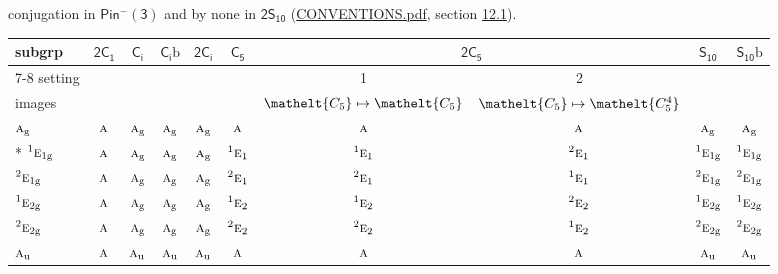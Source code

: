 \documentclass[10pt,a4paper]{article}
\numberwithin{equation}{section}
\newcommand{\eltfont}[1]{{\let\sigma\eltsigma\mathelt{#1}}}
\newcommand{\grp}[1]{\mathsf{#1}}
\newcommand{\irr}[1]{\text{\normalfont\scshape #1}}
\newcommand{\conjpair}[1]{{}^{#1}}
\newcommand{\cls}[1]{\eltfont{#1}}
\newcommand{\ptag}[1]{\mathrm{#1}}
\newcommand{\secondclass}{\mathrm{b}}
\begin{document}
conjugation in \href{Pinminus3.pdf}{$\grp{Pin^{-}(3)}$} and by none in $\grp{2S_{10}}$ (\href{../../CONVENTIONS.pdf}{CONVENTIONS.pdf}, section \href{../../../rotation/CONVENTIONS.pdf\#conv.12.1}{12.1}).
{\small\begin{longtable}{@{}lccccccccc@{}}\toprule
subgrp & \href{2C1.pdf}{$\grp{2C_{1}}$} & \href{S2.pdf}{$\grp{C_{i}}$} & \href{S2b.pdf}{$\grp{C_{i}}\secondclass$} & \href{2S2.pdf}{$\grp{2C_{i}}$} & \href{C5.pdf}{$\grp{C_{5}}$} & \multicolumn{2}{c}{\href{2C5.pdf}{$\grp{2C_{5}}$}} & \href{S10.pdf}{$\grp{S_{10}}$} & \href{S10b.pdf}{$\grp{S_{10}}\secondclass$}\\\cmidrule(lr){7-8}
setting &  &  &  &  &  & 1 & 2 &  & \\
images &  &  &  &  &  & {\scriptsize $\cls{C_{5}} \mapsto \cls{C_{5}}$} & {\scriptsize $\cls{C_{5}} \mapsto \cls{C_{5}^{4}}$} &  & \\\midrule\endhead
\bottomrule\endfoot\endlastfoot
$\irr{a}_{\ptag{g}}$ & $\irr{a}$ & $\irr{a}_{\ptag{g}}$ & $\irr{a}_{\ptag{g}}$ & $\irr{a}_{\ptag{g}}$ & $\irr{a}$ & $\irr{a}$ & $\irr{a}$ & $\irr{a}_{\ptag{g}}$ & $\irr{a}_{\ptag{g}}$\\*
$\conjpair{1}\irr{e}_{1\ptag{g}}$ & $\irr{a}$ & $\irr{a}_{\ptag{g}}$ & $\irr{a}_{\ptag{g}}$ & $\irr{a}_{\ptag{g}}$ & $\conjpair{1}\irr{e}_{1}$ & $\conjpair{1}\irr{e}_{1}$ & $\conjpair{2}\irr{e}_{1}$ & $\conjpair{1}\irr{e}_{1\ptag{g}}$ & $\conjpair{1}\irr{e}_{1\ptag{g}}$\\
$\conjpair{2}\irr{e}_{1\ptag{g}}$ & $\irr{a}$ & $\irr{a}_{\ptag{g}}$ & $\irr{a}_{\ptag{g}}$ & $\irr{a}_{\ptag{g}}$ & $\conjpair{2}\irr{e}_{1}$ & $\conjpair{2}\irr{e}_{1}$ & $\conjpair{1}\irr{e}_{1}$ & $\conjpair{2}\irr{e}_{1\ptag{g}}$ & $\conjpair{2}\irr{e}_{1\ptag{g}}$\\
$\conjpair{1}\irr{e}_{2\ptag{g}}$ & $\irr{a}$ & $\irr{a}_{\ptag{g}}$ & $\irr{a}_{\ptag{g}}$ & $\irr{a}_{\ptag{g}}$ & $\conjpair{1}\irr{e}_{2}$ & $\conjpair{1}\irr{e}_{2}$ & $\conjpair{2}\irr{e}_{2}$ & $\conjpair{1}\irr{e}_{2\ptag{g}}$ & $\conjpair{1}\irr{e}_{2\ptag{g}}$\\
$\conjpair{2}\irr{e}_{2\ptag{g}}$ & $\irr{a}$ & $\irr{a}_{\ptag{g}}$ & $\irr{a}_{\ptag{g}}$ & $\irr{a}_{\ptag{g}}$ & $\conjpair{2}\irr{e}_{2}$ & $\conjpair{2}\irr{e}_{2}$ & $\conjpair{1}\irr{e}_{2}$ & $\conjpair{2}\irr{e}_{2\ptag{g}}$ & $\conjpair{2}\irr{e}_{2\ptag{g}}$\\
$\irr{a}_{\ptag{u}}$ & $\irr{a}$ & $\irr{a}_{\ptag{u}}$ & $\irr{a}_{\ptag{u}}$ & $\irr{a}_{\ptag{u}}$ & $\irr{a}$ & $\irr{a}$ & $\irr{a}$ & $\irr{a}_{\ptag{u}}$ & $\irr{a}_{\ptag{u}}$\\

\end{longtable}}
\end{document}
